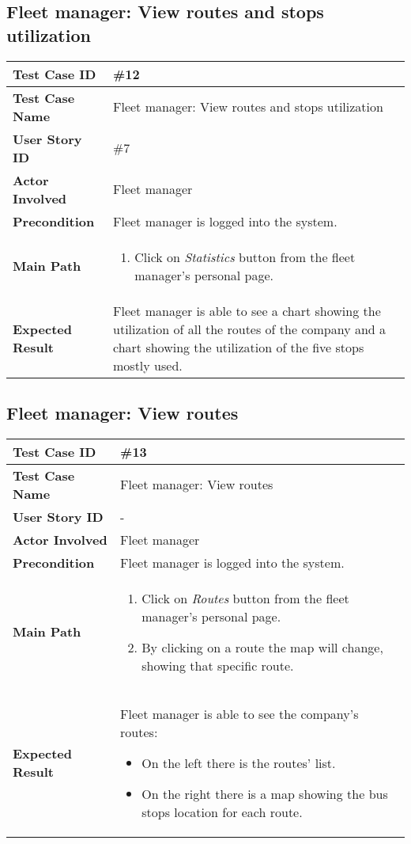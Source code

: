 \subsection{Fleet manager: View routes and stops utilization}
\begin{center}
	\begin{tabular} { | m{3.5cm} | m{9.5cm} | }
		\hline
		\textbf{Test Case ID} & \#12\\
		\hline
		\textbf{Test Case Name} & Fleet manager: View routes and stops utilization\\
		\hline
		\textbf{User Story ID} & \#7 \\
		\hline
		\textbf{Actor Involved} & Fleet manager\\
		\hline
		\textbf{Precondition} & Fleet manager is logged into the system.\\
		\hline
		\textbf{Main Path} & 
		\begin{enumerate}
			\item Click on \textit{Statistics} button from the fleet manager's personal page.
		\end{enumerate}\\
		\hline
		\textbf{Expected Result} & Fleet manager is able to see a chart showing the utilization of all the routes of the company and a chart showing the utilization of the five stops mostly used.\\
		\hline
	\end{tabular}
\end{center}
\subsection{Fleet manager: View routes}
\begin{center}
	\begin{tabular} { | m{3.5cm} | m{9.5cm} | }
		\hline
		\textbf{Test Case ID} & \#13\\
		\hline
		\textbf{Test Case Name} & Fleet manager: View routes \\
		\hline
		\textbf{User Story ID} & - \\
		\hline
		\textbf{Actor Involved} & Fleet manager\\
		\hline
		\textbf{Precondition} & Fleet manager is logged into the system.\\
		\hline
		\textbf{Main Path} & 
		\begin{enumerate}
			\item Click on \textit{Routes} button from the fleet manager's personal page.
			\item By clicking on a route the map will change, showing that specific route.
		\end{enumerate}\\
		\hline
		\textbf{Expected Result} & Fleet manager is able to see the company's routes:
		\begin{itemize}
			\item On the left there is the routes' list.
			\item On the right there is a map showing the bus stops location for each route. 
		\end{itemize}\\
		\hline
	\end{tabular}
\end{center}
\newpage
